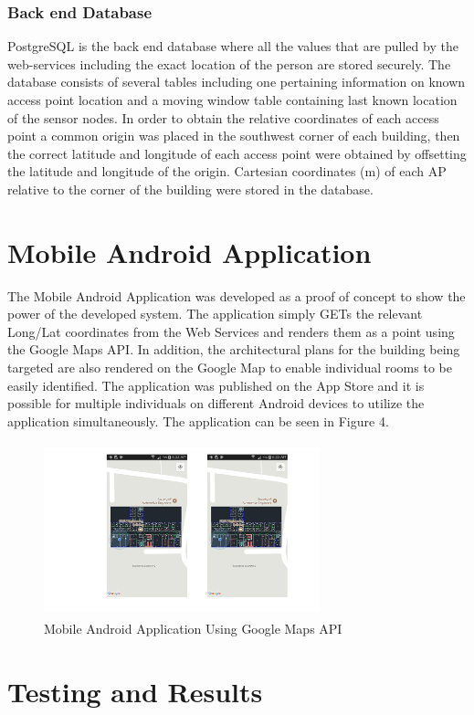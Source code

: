 \documentclass[conference]{IEEEtran}
\begin{document}
\subsubsection{Back end Database}
PostgreSQL is the back end database where all the values that are pulled by the web-services including the exact location of the person are stored securely. The database consists of several tables including one pertaining information on known access point location and a moving window table containing last known location of the sensor nodes. In order to obtain the relative coordinates of each access point a common origin was placed in the southwest corner of each building, then the correct latitude and longitude of each access point were obtained by offsetting the latitude and longitude of the origin. Cartesian coordinates (m) of each AP relative to the corner of the building were stored in the database.
\newline

\section{Mobile Android Application}
 The Mobile Android Application was developed as a proof of concept to show the power of the developed system. The application simply GETs the relevant Long/Lat coordinates from the Web Services and renders them as a point using the Google Maps API. In addition, the architectural plans for the building being targeted are also rendered on the Google Map to enable individual rooms to be easily identified. The application was published on the App Store and it is possible for multiple individuals on different Android devices to utilize the application simultaneously. The application can be seen in Figure 4.
\begin{figure}[H]
    \includegraphics[width=8cm,height=5cm]{2018-05-10-PHOTO-00000078.png}
    \caption{Mobile Android Application Using Google Maps API}
    \end{figure}
\section{Testing and Results}
\end{document}
